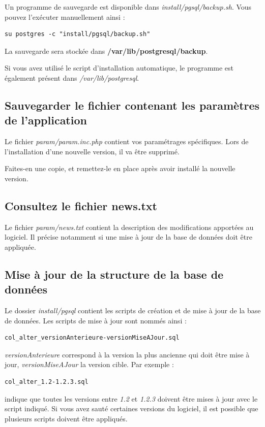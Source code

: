 Un programme de sauvegarde est disponible dans \textit{install/pgsql/backup.sh}. Vous pouvez l'exécuter manuellement ainsi :
\begin{lstlisting}
su postgres -c "install/pgsql/backup.sh"
\end{lstlisting}

La sauvegarde sera stockée dans \textbf{/var/lib/postgresql/backup}.

Si vous avez utilisé le script d'installation automatique, le programme est également présent dans \textit{/var/lib/postgresql}.

\subsection{Sauvegarder le fichier contenant les paramètres de l'application}

Le fichier \textit{param/param.inc.php} contient vos paramétrages spécifiques. Lors de l'installation d'une nouvelle version, il va être supprimé.

Faites-en une copie, et remettez-le en place après avoir installé la nouvelle version.

\subsection{Consultez le fichier news.txt}

Le fichier \textit{param/news.txt} contient la description des modifications apportées au logiciel. Il précise notamment si une mise à jour de la base de données doit être appliquée.

\subsection{Mise à jour de la structure de la base de données}

Le dossier \textit{install/pgsql} contient les scripts de création et de mise à jour de la base de données. Les scripts de mise à jour sont nommés ainsi :
\begin{lstlisting}
col_alter_versionAnterieure-versionMiseAJour.sql
\end{lstlisting}

\textit{versionAnterieure} correspond à la version la plus ancienne qui doit être mise à jour, \textit{versionMiseAJour} la version cible. Par exemple :
\begin{lstlisting}
col_alter_1.2-1.2.3.sql
\end{lstlisting}
indique que toutes les versions entre \textit{1.2} et \textit{1.2.3} doivent être mises à jour avec le script indiqué. Si vous avez \og sauté \fg{} certaines versions du logiciel, il est possible que plusieurs scripts doivent être appliqués.

